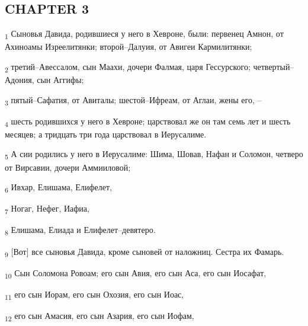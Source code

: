 \subsection{CHAPTER 3}
\begin{tcolorbox}
\textsubscript{1} Сыновья Давида, родившиеся у него в Хевроне, были: первенец Амнон, от Ахиноамы Изреелитянки; второй--Далуия, от Авигеи Кармилитянки;
\end{tcolorbox}
\begin{tcolorbox}
\textsubscript{2} третий--Авессалом, сын Маахи, дочери Фалмая, царя Гессурского; четвертый--Адония, сын Аггифы;
\end{tcolorbox}
\begin{tcolorbox}
\textsubscript{3} пятый--Сафатия, от Авиталы; шестой--Ифреам, от Аглаи, жены его, --
\end{tcolorbox}
\begin{tcolorbox}
\textsubscript{4} шесть родившихся у него в Хевроне; царствовал же он там семь лет и шесть месяцев; а тридцать три года царствовал в Иерусалиме.
\end{tcolorbox}
\begin{tcolorbox}
\textsubscript{5} А сии родились у него в Иерусалиме: Шима, Шовав, Нафан и Соломон, четверо от Вирсавии, дочери Аммииловой;
\end{tcolorbox}
\begin{tcolorbox}
\textsubscript{6} Ивхар, Елишама, Елифелет,
\end{tcolorbox}
\begin{tcolorbox}
\textsubscript{7} Ногаг, Нефег, Иафиа,
\end{tcolorbox}
\begin{tcolorbox}
\textsubscript{8} Елишама, Елиада и Елифелет--девятеро.
\end{tcolorbox}
\begin{tcolorbox}
\textsubscript{9} [Вот] все сыновья Давида, кроме сыновей от наложниц. Сестра их Фамарь.
\end{tcolorbox}
\begin{tcolorbox}
\textsubscript{10} Сын Соломона Ровоам; его сын Авия, его сын Аса, его сын Иосафат,
\end{tcolorbox}
\begin{tcolorbox}
\textsubscript{11} его сын Иорам, его сын Охозия, его сын Иоас,
\end{tcolorbox}
\begin{tcolorbox}
\textsubscript{12} его сын Амасия, его сын Азария, его сын Иофам,
\end{tcolorbox}
